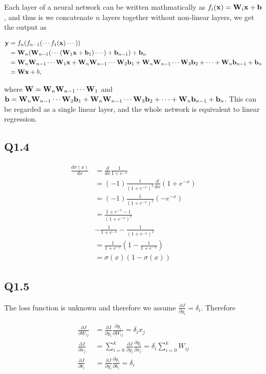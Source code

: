 \documentclass[11pt]{article}
\begin{document}
Each layer of a neural network can be written mathmatically as $f_i(\mathbf{x})=\mathbf{W}_i\mathbf{x}+\mathbf{b}$, and thus is we concatenate $n$ layers together without non-linear layers, we get the output as

\begin{align}
  \mathbf{y} &= f_n(f_{n-1}(\cdots f_1(\mathbf{x}) \cdots)) \\
  &= \mathbf{W}_n (\mathbf{W}_{n-1} (\cdots(\mathbf{W}_1\mathbf{x}+\mathbf{b}_1)\cdots) +\mathbf{b}_{n-1}) + \mathbf{b}_n \\
  &= \mathbf{W}_n \mathbf{W}_{n-1}\cdots \mathbf{W}_1 \mathbf{x} + \mathbf{W}_n \mathbf{W}_{n-1}\cdots \mathbf{W}_2 \mathbf{b}_1 + \mathbf{W}_n \mathbf{W}_{n-1}\cdots \mathbf{W}_3 \mathbf{b}_2 + \cdots + \mathbf{W}_n\mathbf{b}_{n-1} + \mathbf{b}_n\\
  &= \mathbf{W}\mathbf{x}+b,
\end{align}

where $\mathbf{W} = \mathbf{W}_n \mathbf{W}_{n-1}\cdots \mathbf{W}_1$ and $\mathbf{b} = \mathbf{W}_n \mathbf{W}_{n-1}\cdots \mathbf{W}_2 \mathbf{b}_1 + \mathbf{W}_n \mathbf{W}_{n-1}\cdots \mathbf{W}_3 \mathbf{b}_2 + \cdots + \mathbf{W}_n\mathbf{b}_{n-1} + \mathbf{b}_n$. This can be regarded as a single linear layer, and the whole network is equivalent to linear regression.

\newpage

\subsection*{Q1.4}

\begin{align}
  \frac{d\sigma(x)}{dx} &= \frac{d}{dx}\frac{1}{1+e^{-x}} \\
  &= (-1)\frac{1}{(1+e^{-x})^2} \frac{d}{dx} (1+e^{-x}) \\
  &= (-1)\frac{1}{(1+e^{-x})^2} (-e^{-x}) \\
  &= \frac{1+e^{-x}-1}{(1+e^{-x})^2} \\
  &- \frac{1}{1+e^{-x}} - \frac{1}{(1+e^{-x})^2} \\
  &= \frac{1}{1+e^{-x}} (1-\frac{1}{1+e^{-x}}) \\
  &= \sigma(x) (1-\sigma(x))
\end{align}

\newpage
\subsection*{Q1.5}

\newcommand{\bdelta} {\mathbf{\delta}}

The loss function is unknown and therefore we assume $\frac{\partial J}{\partial y_i} = \delta_i$. Therefore

\begin{align}
  \frac{\partial J}{\partial W_{ij}} &= \frac{\partial J}{\partial y_i} \frac{\partial y_i}{\partial W_{ij}} = \delta_i x_j \\
  \frac{\partial J}{\partial x_j} &= \sum_{i=0}^k \frac{\partial J}{\partial y_i}\frac{\partial y_i}{\partial x_j} = \delta_i \sum_{i=0}^k W_{ij} \\
  \frac{\partial J}{\partial b_i} &= \frac{\partial J}{\partial y_i} \frac{\partial y_i}{\partial b_i} = \delta_i
\end{align}
\end{document}
